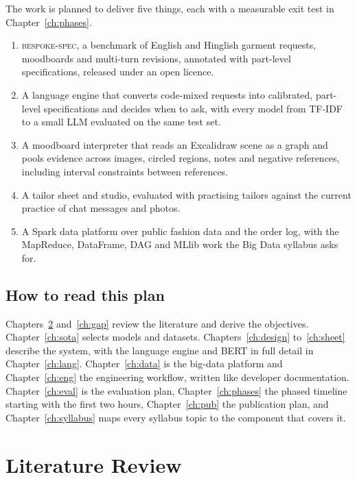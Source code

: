 The work is planned to deliver five things, each with a measurable exit test in Chapter~\ref{ch:phases}.

\begin{enumerate}
\item \textsc{bespoke-spec}, a benchmark of English and Hinglish garment requests, moodboards and multi-turn revisions, annotated with part-level specifications, released under an open licence.
\item A language engine that converts code-mixed requests into calibrated, part-level specifications and decides when to ask, with every model from TF-IDF to a small LLM evaluated on the same test set.
\item A moodboard interpreter that reads an Excalidraw scene as a graph and pools evidence across images, circled regions, notes and negative references, including interval constraints between references.
\item A tailor sheet and studio, evaluated with practising tailors against the current practice of chat messages and photos.
\item A Spark data platform over public fashion data and the order log, with the MapReduce, DataFrame, DAG and MLlib work the Big Data syllabus asks for.
\end{enumerate}

\section{How to read this plan}

Chapters~\ref{ch:lit} and~\ref{ch:gap} review the literature and derive the objectives. Chapter~\ref{ch:sota} selects models and datasets. Chapters~\ref{ch:design} to~\ref{ch:sheet} describe the system, with the language engine and BERT in full detail in Chapter~\ref{ch:lang}. Chapter~\ref{ch:data} is the big-data platform and Chapter~\ref{ch:eng} the engineering workflow, written like developer documentation. Chapter~\ref{ch:eval} is the evaluation plan, Chapter~\ref{ch:phases} the phased timeline starting with the first two hours, Chapter~\ref{ch:pub} the publication plan, and Chapter~\ref{ch:syllabus} maps every syllabus topic to the component that covers it.

\chapter{Literature Review}\label{ch:lit}

